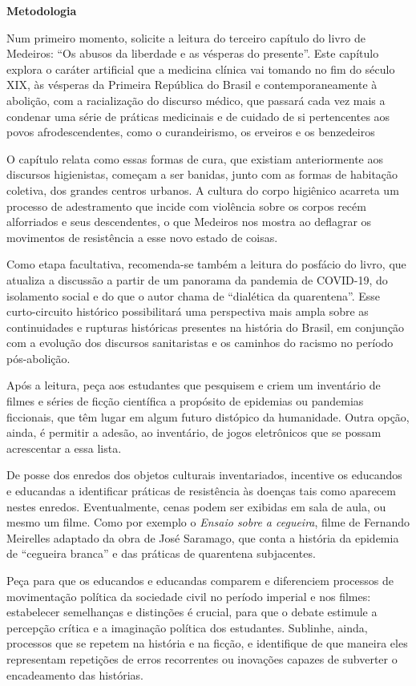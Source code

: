 \documentclass[12pt]{extarticle}
\begin{document}
\textbf{Metodologia}

Num primeiro momento, solicite a leitura do terceiro capítulo do livro
de Medeiros: ``Os abusos da liberdade e as vésperas do presente''. Este
capítulo explora o caráter artificial que a medicina clínica vai tomando
no fim do século XIX, às vésperas da Primeira República do Brasil e
contemporaneamente à abolição, com a racialização do discurso médico,
que passará cada vez mais a condenar uma série de práticas medicinais e
de cuidado de si pertencentes aos povos afrodescendentes, como o
curandeirismo, os erveiros e os benzedeiros

O capítulo relata como essas formas de cura, que existiam anteriormente
aos discursos higienistas, começam a ser banidas, junto com as formas de
habitação coletiva, dos grandes centros urbanos. A cultura do corpo
higiênico acarreta um processo de adestramento que incide com violência
sobre os corpos recém alforriados e seus descendentes, o que Medeiros
nos mostra ao deflagrar os movimentos de resistência a esse novo estado
de coisas.

Como etapa facultativa, recomenda-se também a leitura do posfácio do
livro, que atualiza a discussão a partir de um panorama da pandemia de
COVID-19, do isolamento social e do que o autor chama de ``dialética da
quarentena''. Esse curto-circuito histórico possibilitará uma
perspectiva mais ampla sobre as continuidades e rupturas históricas
presentes na história do Brasil, em conjunção com a evolução dos
discursos sanitaristas e os caminhos do racismo no período pós-abolição.

Após a leitura, peça aos estudantes que pesquisem e criem um inventário
de filmes e séries de ficção científica a propósito de epidemias ou
pandemias ficcionais, que têm lugar em algum futuro distópico da
humanidade. Outra opção, ainda, é permitir a adesão, ao inventário, de
jogos eletrônicos que se possam acrescentar a essa lista.

De posse dos enredos dos objetos culturais inventariados, incentive os
educandos e educandas a identificar práticas de resistência às doenças
tais como aparecem nestes enredos. Eventualmente, cenas podem ser
exibidas em sala de aula, ou mesmo um filme. Como por exemplo o
\emph{Ensaio sobre a cegueira}, filme de Fernando Meirelles adaptado da
obra de José Saramago, que conta a história da epidemia de ``cegueira
branca'' e das práticas de quarentena subjacentes.

Peça para que os educandos e educandas comparem e diferenciem processos
de movimentação política da sociedade civil no período imperial e nos
filmes: estabelecer semelhanças e distinções é crucial, para que o
debate estimule a percepção crítica e a imaginação política dos
estudantes. Sublinhe, ainda, processos que se repetem na história e na
ficção, e identifique de que maneira eles representam repetições de
erros recorrentes ou inovações capazes de subverter o encadeamento das
histórias.
\end{document}
